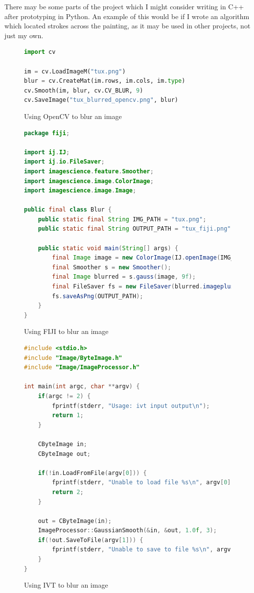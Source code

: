 \documentclass[11pt,fleqn,twoside]{article}
\begin{document}
There may be some parts of the project which I might consider writing in C++ after prototyping in 
Python. An example of this would be if I wrote an algorithm which located strokes across the 
painting, as it may be used in other projects, not just my own.


\begin{figure}[p]
\begin{lstlisting}[language=Python]
import cv

im = cv.LoadImageM("tux.png")
blur = cv.CreateMat(im.rows, im.cols, im.type)
cv.Smooth(im, blur, cv.CV_BLUR, 9)
cv.SaveImage("tux_blurred_opencv.png", blur)
\end{lstlisting}
\caption{Using OpenCV to blur an image}
\label{fig:opencv}
\end{figure}

\begin{figure}[p]
\begin{lstlisting}[language=Java]
package fiji;

import ij.IJ;
import ij.io.FileSaver;
import imagescience.feature.Smoother;
import imagescience.image.ColorImage;
import imagescience.image.Image;

public final class Blur {
	public static final String IMG_PATH = "tux.png";
	public static final String OUTPUT_PATH = "tux_fiji.png";

	public static void main(String[] args) {
		final Image image = new ColorImage(IJ.openImage(IMG_PATH));
		final Smoother s = new Smoother();
		final Image blurred = s.gauss(image, 9f);
		final FileSaver fs = new FileSaver(blurred.imageplus());
		fs.saveAsPng(OUTPUT_PATH);
	}
}
\end{lstlisting}
\caption{Using FIJI to blur an image}
\label{fig:fiji}
\end{figure}

\begin{figure}[p]
\begin{lstlisting}[language=C++]
#include <stdio.h>
#include "Image/ByteImage.h"
#include "Image/ImageProcessor.h"

int main(int argc, char **argv) {
	if(argc != 2) {
		fprintf(stderr, "Usage: ivt input output\n");
		return 1;
	}

	CByteImage in;
	CByteImage out;

	if(!in.LoadFromFile(argv[0])) {
		fprintf(stderr, "Unable to load file %s\n", argv[0]);
		return 2;
	}

	out = CByteImage(in);
	ImageProcessor::GaussianSmooth(&in, &out, 1.0f, 3);
	if(!out.SaveToFile(argv[1])) {
		fprintf(stderr, "Unable to save to file %s\n", argv[1]);
	}
}
\end{lstlisting}
\caption{Using IVT to blur an image}
\label{fig:ivt}
\end{figure}
\end{document}
